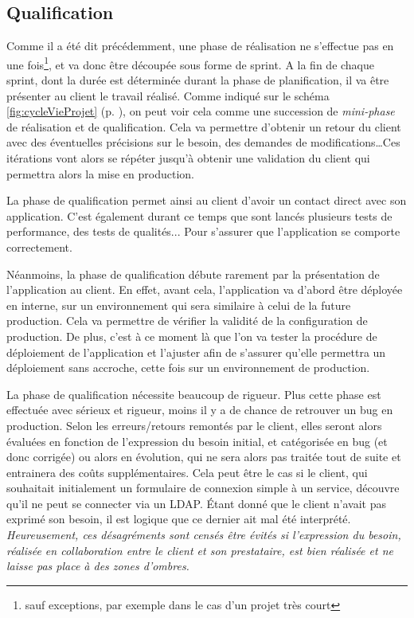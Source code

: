 \subsection{Qualification}


Comme il a été dit précédemment, une phase de réalisation ne s'effectue pas en une fois\footnote{sauf exceptions, par exemple dans le cas d'un projet très court}, et va donc être découpée sous forme de sprint. A la fin de chaque sprint, dont la durée est déterminée durant la phase de planification, il va être présenter au client le travail réalisé. Comme indiqué sur le schéma \ref{fig:cycleVieProjet} (p. \pageref{fig:cycleVieProjet}), on peut voir cela comme une succession de \emph{mini-phase} de réalisation et de qualification. Cela va permettre d'obtenir un retour du client avec des éventuelles précisions sur le besoin, des demandes de modifications\ldots Ces itérations vont alors se répéter jusqu'à obtenir une validation du client qui permettra alors la mise en production.

La phase de qualification permet ainsi au client d'avoir un contact direct avec son application. C'est également durant ce temps que sont lancés plusieurs tests de performance, des tests de qualités... Pour s'assurer que l'application se comporte correctement.

Néanmoins, la phase de qualification débute rarement par la présentation de l'application au client. En effet, avant cela, l'application va d'abord être déployée en interne, sur un environnement qui sera similaire à celui de la future production. Cela va permettre de vérifier la validité de la configuration de production. De plus, c'est à ce moment là que l'on va tester la procédure de déploiement de l'application et l'ajuster afin de s'assurer qu'elle permettra un déploiement sans accroche, cette fois sur un environnement de production.

La phase de qualification nécessite beaucoup de rigueur. Plus cette phase est effectuée avec sérieux et rigueur, moins il y a de chance de retrouver un bug en production. Selon les erreurs/retours remontés par le client, elles seront alors évaluées en fonction de l'expression du besoin initial, et catégorisée en bug (et donc corrigée) ou alors en évolution, qui ne sera alors pas traitée tout de suite et entrainera des coûts supplémentaires. Cela peut être le cas si le client, qui souhaitait initialement un formulaire de connexion simple à un service, découvre qu'il ne peut se connecter via un \gls{LDAP}. Étant donné que le client n'avait pas exprimé son besoin, il est logique que ce dernier ait mal été interprété. \emph{Heureusement, ces désagréments sont censés être évités si l'expression du besoin, réalisée en collaboration entre le client et son prestataire, est bien réalisée et ne laisse pas place à des zones d'ombres.}

